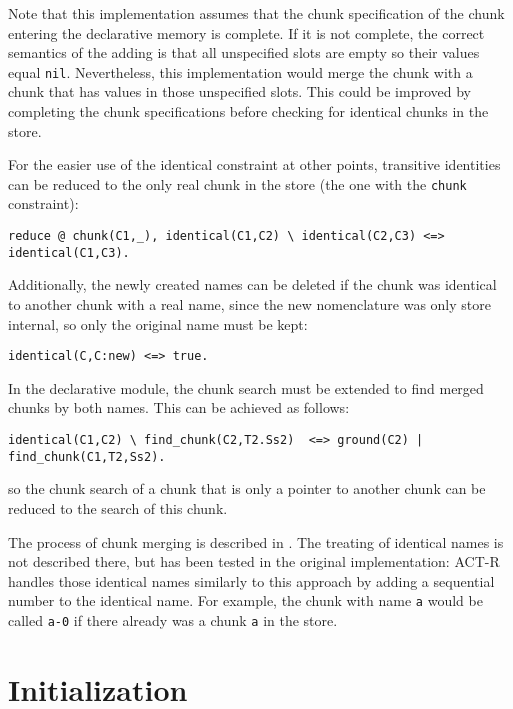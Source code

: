 Note that this implementation assumes that the chunk specification of the chunk entering the declarative memory is complete. If it is not complete, the correct semantics of the adding is that all unspecified slots are empty so their values equal \verb|nil|. Nevertheless, this implementation would merge the chunk with a chunk that has values in those unspecified slots. This could be improved by completing the chunk specifications before checking for identical chunks in the store.

For the easier use of the identical constraint at other points, transitive identities can be reduced to the only real chunk in the store (the one with the \verb|chunk| constraint):

\begin{lstlisting}
reduce @ chunk(C1,_), identical(C1,C2) \ identical(C2,C3) <=> identical(C1,C3).
\end{lstlisting}

Additionally, the newly created names can be deleted if the chunk was identical to another chunk with a real name, since the new nomenclature was only store internal, so only the original name must be kept:

\begin{lstlisting}
identical(C,C:new) <=> true.
\end{lstlisting}

In the declarative module, the chunk search must be extended to find merged chunks by both names. This can be achieved as follows:

\begin{lstlisting}
identical(C1,C2) \ find_chunk(C2,T2.Ss2)  <=> ground(C2) | find_chunk(C1,T2,Ss2).
\end{lstlisting}

so the chunk search of a chunk that is only a pointer to another chunk can be reduced to the search of this chunk. 

The process of chunk merging is described in \cite[??]{actr_reference}. The treating of identical names is not described there, but has been tested in the original implementation: ACT-R handles those identical names similarly to this approach by adding a sequential number to the identical name. For example, the chunk with name \verb|a| would be called \verb|a-0| if there already was a chunk \verb|a| in the store.

\section{Initialization}
\label{initialization}

